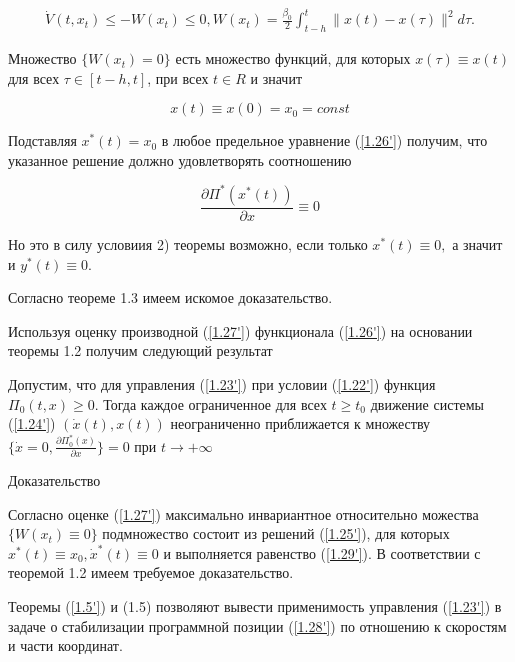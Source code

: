 \begin{equation} \label{1.27'}
	\begin{array}{c}
	\displaystyle \dot V(t, x_t) \le - W(x_t) \le 0, W(x_t) = \frac{\beta_0}{2} \int_{t - h}^{t} \| x(t) - x(\tau) \| ^ 2 d \tau.
	\end{array}
\end{equation}

Множество $\{ W(x_t) = 0 \}$ есть множество функций, для которых $x(\tau) \equiv x(t)$ для всех $\tau \in [t - h, t]$, при всех $t \in R$ и значит 

\begin{equation} \label{1.28'}
x(t) \equiv x(0) = x_0 = const
\end{equation}

Подставляя $x^{*}(t) = x_0$ в любое предельное уравнение (\ref{1.26'}) получим, что указанное решение должно удовлетворять соотношению 

\begin{equation} \label{1.29'}
\frac{\partial \Pi^{*} (x^{*} (t))}{\partial x} \equiv 0
\end{equation}

Но это в силу условиия 2) теоремы возможно, если только $x^{*} (t) \equiv 0,$ а значит и $y^{*}(t) \equiv 0.$

Согласно теореме 1.3 имеем искомое доказательство.

Используя оценку производной (\ref{1.27'}) функционала (\ref{1.26'}) на основании теоремы 1.2 получим следующий результат

\begin{theorem}\label{t-1.7}
Допустим, что для управления (\ref{1.23'}) при условии (\ref{1.22'}) функция $\Pi_0 (t, x) \ge 0$. Тогда каждое ограниченное для всех $t \ge t_0$ движение системы (\ref{1.24'}) $(\dot x(t), x(t))$ неограниченно приближается к множеству $ \lbrace \dot x = 0, \frac{\partial \Pi_0^{*} (x)}{\partial x} \rbrace = 0$ при $t \to + \infty$
\end{theorem}

Доказательство

Согласно оценке (\ref{1.27'}) максимально инвариантное относительно можества $\{ W(x_t) \equiv 0 \}$ подмножество состоит из решений (\ref{1.25'}), для которых $x^{*} (t) \equiv x_0, \dot x^{*}(t) \equiv 0$ и выполняется равенство (\ref{1.29'}). В соответствии с теоремой 1.2 имеем требуемое доказательство.

Теоремы (\ref{1.5'}) и (1.5) позволяют вывести применимость управления (\ref{1.23'}) в задаче о стабилизации программной позиции (\ref{1.28'}) по отношению к скоростям и части координат. 

